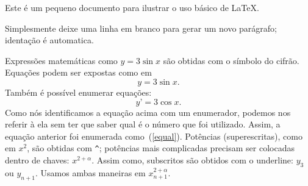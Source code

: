 \documentclass{article}
\begin{document}
Este é um pequeno documento para ilustrar o uso básico de LaTeX.

Simplesmente deixe uma linha em branco para gerar um novo parágrafo; identação é
automatica.

Expressões matemáticas como  $y = 3\sin x$ são obtidas com o símbolo do cifrão.
Equações podem ser expostas como em 
\[ y = 3\sin x.\]
Também é possível enumerar equações:
\begin{equation}\label{equal}
y’ =3\cos x.
\end{equation}
Como nós identificamos a equação acima com um enumerador, podemos nos referir
à ela sem ter que saber qual é o número que foi utilizado. Assim, a equação anterior foi enumerada como~(\ref{equal}).
Potências (superescritas), como em $x^2$, são obtidas com \verb"^";
potências mais complicadas precisam ser colocadas dentro de chaves: $x^{2+\alpha}$.
Assim como, subscritos são obtidos com o underline: $y_3$ ou $y_{n+1}$.
Usamos ambas maneiras em $x_{n+1}^{2+\alpha}$.
\end{document}
